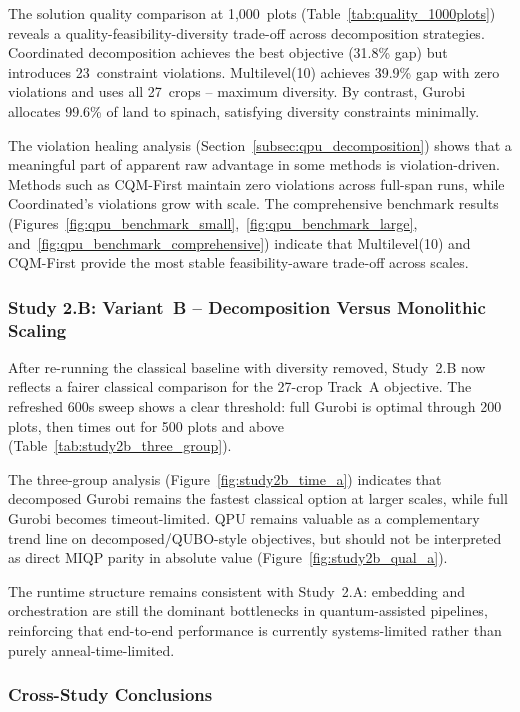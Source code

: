 \documentclass{oqireport}
\begin{document}
The solution quality comparison at 1,000~plots (Table~\ref{tab:quality_1000plots}) reveals a quality-feasibility-diversity trade-off across decomposition strategies. Coordinated decomposition achieves the best objective (31.8\% gap) but introduces 23~constraint violations. Multilevel(10) achieves 39.9\% gap with zero violations and uses all 27~crops -- maximum diversity. By contrast, Gurobi allocates 99.6\% of land to spinach, satisfying diversity constraints minimally.

The violation healing analysis (Section~\ref{subsec:qpu_decomposition}) shows that a meaningful part of apparent raw advantage in some methods is violation-driven. Methods such as CQM-First maintain zero violations across full-span runs, while Coordinated's violations grow with scale. The comprehensive benchmark results (Figures~\ref{fig:qpu_benchmark_small},~\ref{fig:qpu_benchmark_large}, and~\ref{fig:qpu_benchmark_comprehensive}) indicate that Multilevel(10) and CQM-First provide the most stable feasibility-aware trade-off across scales.

\subsubsection{Study 2.B: Variant~B -- Decomposition Versus Monolithic Scaling}

After re-running the classical baseline with diversity removed, Study~2.B now reflects a fairer classical comparison for the 27-crop Track~A objective. The refreshed 600s sweep shows a clear threshold: full Gurobi is optimal through 200 plots, then times out for 500 plots and above (Table~\ref{tab:study2b_three_group}).

The three-group analysis (Figure~\ref{fig:study2b_time_a}) indicates that decomposed Gurobi remains the fastest classical option at larger scales, while full Gurobi becomes timeout-limited. QPU remains valuable as a complementary trend line on decomposed/QUBO-style objectives, but should not be interpreted as direct MIQP parity in absolute value (Figure~\ref{fig:study2b_qual_a}).

The runtime structure remains consistent with Study~2.A: embedding and orchestration are still the dominant bottlenecks in quantum-assisted pipelines, reinforcing that end-to-end performance is currently systems-limited rather than purely anneal-time-limited.

\subsubsection{Cross-Study Conclusions}
\end{document}
